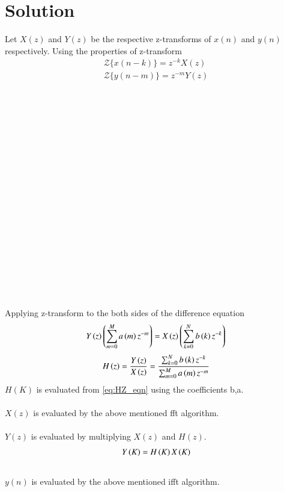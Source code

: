 \documentclass[journal,12pt,twocolumn]{IEEEtran}
\begin{document}
  \section{Solution}
  
  Let $X(z)$ and $Y(z)$ be the respective z-transforms of $x(n)$ and $y(n)$ respectively.
  Using the properties of z-transform
  \begin{align}
      {\mathcal {Z}}\{x(n-k)\} = z^{-k}X(z) \\
      {\mathcal {Z}}\{y(n-m)\} = z^{-m}Y(z)
  \end{align}
\newline
\\
\\
\\
\\
\\
\\
\\
\\
\\
\\
\\
\\
\\
\\
\\
\\
\\
\\
\\
Applying z-transform  to the both sides of the difference equation
\begin{align}
     Y\left(z\right) \left(\sum _{m=0}^{M}a\left(m\right) z^{-m}\right) = X\left(z\right) \left(\sum _{k=0}^{N}b\left(k\right)z^{-k}\right)
\end{align}
\begin{align}
\label{eq:HZ_eqn}
    H\left(z\right) = \frac{Y\left(z\right)}{X\left(z\right)} = \frac{\sum _{k=0}^{N}b\left(k\right) z^{-k}}{\sum _{m=0}^{M}a\left(m\right)z^{-m}}
\end{align}    
$H(K)$ is evaluated from \eqref{eq:HZ_eqn} using the coefficients b,a.
\\
\\
$X(z)$ is evaluated by the above mentioned fft algorithm.
\\
\\
$Y(z)$ is evaluated by multiplying $X(z)$ and $H(z)$.
\begin{align}
    Y\left(K\right) = H\left(K\right)X\left(K\right)
\end{align}
\\
$y(n)$ is evaluated by the above mentioned ifft algorithm.
\end{document}
